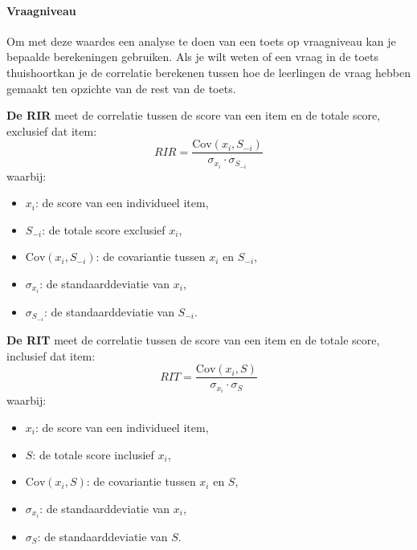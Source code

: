 \documentclass[12pt]{article}
\begin{document}
\vspace{3em}
\begin{multicols}{2}

\pagebreak
\paragraph*{Vraagniveau} Om met deze waardes een analyse te doen van een toets op vraagniveau kan je bepaalde berekeningen gebruiken. Als je wilt weten of een vraag in de toets thuishoortkan je de correlatie berekenen tussen hoe de leerlingen de vraag hebben gemaakt ten opzichte van de rest van de toets.
\begin{minipage}{\linewidth}%
\textbf{De RIR} meet de correlatie tussen de score van een item en de totale score, exclusief dat item:
\[
RIR = \frac{\text{Cov}(x_i, S_{-i})}{\sigma_{x_i} \cdot \sigma_{S_{-i}}}
\]
waarbij:
\begin{itemize}
    \item \(x_i\): de score van een individueel item,
    \item \(S_{-i}\): de totale score exclusief \(x_i\),
    \item \(\text{Cov}(x_i, S_{-i})\): de covariantie tussen \(x_i\) en \(S_{-i}\),
    \item \(\sigma_{x_i}\): de standaarddeviatie van \(x_i\),
    \item \(\sigma_{S_{-i}}\): de standaarddeviatie van \(S_{-i}\).
\end{itemize}
\end{minipage}
\begin{minipage}{\linewidth}%
\textbf{De RIT} meet de correlatie tussen de score van een item en de totale score, inclusief dat item:
\[
RIT = \frac{\text{Cov}(x_i, S)}{\sigma_{x_i} \cdot \sigma_{S}}
\]
waarbij:
\begin{itemize}
    \item \(x_i\): de score van een individueel item,
    \item \(S\): de totale score inclusief \(x_i\),
    \item \(\text{Cov}(x_i, S)\): de covariantie tussen \(x_i\) en \(S\),
    \item \(\sigma_{x_i}\): de standaarddeviatie van \(x_i\),
    \item \(\sigma_{S}\): de standaarddeviatie van \(S\).
\end{itemize}
\end{minipage}
\end{multicols}
\end{document}
